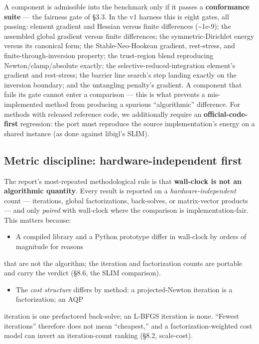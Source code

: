 \documentclass{egpubl}
\begin{document}
A component is admissible into the benchmark only if it passes a \textbf{conformance suite} --- the fairness
gate of \S3.3. In the v1 harness this is eight gates, all passing: element gradient and Hessian versus
finite differences (\textasciitilde{}1e-9); the assembled global gradient versus finite differences; the
symmetric-Dirichlet energy versus its canonical form; the Stable-Neo-Hookean gradient, rest-stress,
and finite-through-inversion property; the trust-region blend reproducing Newton/clamp/absolute
exactly; the selective-reduced-integration element's gradient and rest-stress; the barrier line
search's step landing exactly on the inversion boundary; and the untangling penalty's gradient. A
component that fails its gate cannot enter a comparison --- this is what prevents a mis-implemented
method from producing a spurious ``algorithmic'' difference. For methods with released reference code,
we additionally require an \textbf{official-code-first} regression: the port must reproduce the source
implementation's energy on a shared instance (as done against libigl's SLIM).

\subsection{Metric discipline: hardware-independent first}

The report's most-repeated methodological rule is that \textbf{wall-clock is not an algorithmic quantity}.
Every result is reported on a \emph{hardware-independent} count --- iterations, global factorizations,
back-solves, or matrix-vector products --- and only \emph{paired} with wall-clock where the comparison is
implementation-fair. This matters because:

\begin{itemize}
  \item A compiled library and a Python prototype differ in wall-clock by orders of magnitude for reasons
\end{itemize}
  that are not the algorithm; the iteration and factorization counts are portable and carry the
  verdict (\S8.6, the SLIM comparison).
\begin{itemize}
  \item The \emph{cost structure} differs by method: a projected-Newton iteration is a factorization; an AQP
\end{itemize}
  iteration is one prefactored back-solve; an L-BFGS iteration is none. ``Fewest iterations'' therefore
  does not mean ``cheapest,'' and a factorization-weighted cost model can invert an iteration-count
  ranking (\S8.2, scale-cost).
\end{document}
